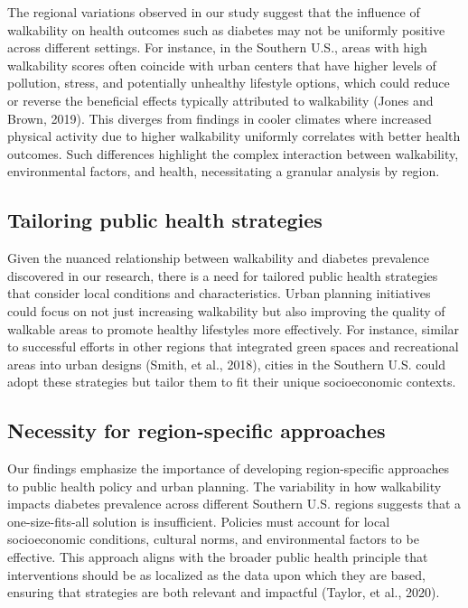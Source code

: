 \documentclass[
]{article}
\begin{document}
The regional variations observed in our study suggest that the influence
of walkability on health outcomes such as diabetes may not be uniformly
positive across different settings. For instance, in the Southern U.S.,
areas with high walkability scores often coincide with urban centers
that have higher levels of pollution, stress, and potentially unhealthy
lifestyle options, which could reduce or reverse the beneficial effects
typically attributed to walkability (Jones and Brown, 2019). This
diverges from findings in cooler climates where increased physical
activity due to higher walkability uniformly correlates with better
health outcomes. Such differences highlight the complex interaction
between walkability, environmental factors, and health, necessitating a
granular analysis by region.

\subsection{Tailoring public health
strategies}\label{tailoring-public-health-strategies}

Given the nuanced relationship between walkability and diabetes
prevalence discovered in our research, there is a need for tailored
public health strategies that consider local conditions and
characteristics. Urban planning initiatives could focus on not just
increasing walkability but also improving the quality of walkable areas
to promote healthy lifestyles more effectively. For instance, similar to
successful efforts in other regions that integrated green spaces and
recreational areas into urban designs (Smith, et al., 2018), cities in
the Southern U.S. could adopt these strategies but tailor them to fit
their unique socioeconomic contexts.

\subsection{Necessity for region-specific
approaches}\label{necessity-for-region-specific-approaches}

Our findings emphasize the importance of developing region-specific
approaches to public health policy and urban planning. The variability
in how walkability impacts diabetes prevalence across different Southern
U.S. regions suggests that a one-size-fits-all solution is insufficient.
Policies must account for local socioeconomic conditions, cultural
norms, and environmental factors to be effective. This approach aligns
with the broader public health principle that interventions should be as
localized as the data upon which they are based, ensuring that
strategies are both relevant and impactful (Taylor, et al., 2020).
\end{document}
